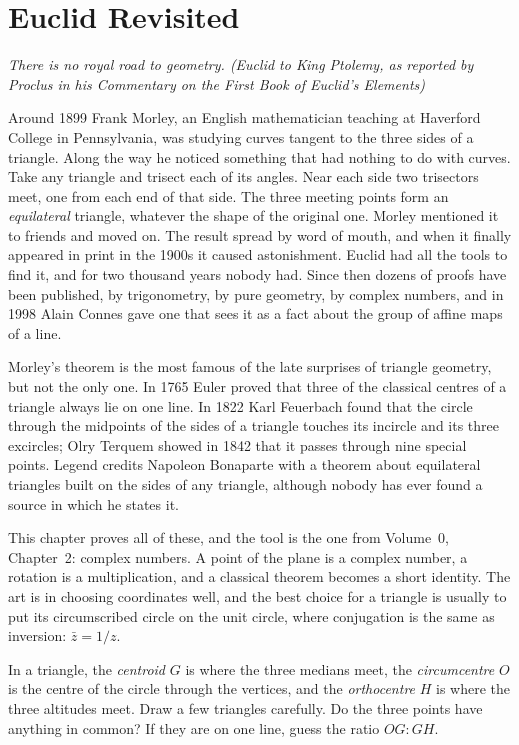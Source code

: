 \chapter{Euclid Revisited}\label{geometry:ch:euclid}

\begin{center}\itshape
There is no royal road to geometry.
\upshape(Euclid to King Ptolemy, as reported by Proclus in his \emph{Commentary on the First Book of Euclid's Elements})
\end{center}

Around 1899 Frank Morley, an English mathematician teaching at Haverford College in Pennsylvania, was studying curves
tangent to the three sides of a triangle. Along the way he noticed something that had nothing to do with curves. Take any
triangle and trisect each of its angles. Near each side two trisectors meet, one from each end of that side. The three
meeting points form an \emph{equilateral} triangle, whatever the shape of the original one. Morley mentioned it to friends
and moved on. The result spread by word of mouth, and when it finally appeared in print in the 1900s it caused
astonishment. Euclid had all the tools to find it, and for two thousand years nobody had. Since then dozens of proofs
have been published, by trigonometry, by pure geometry, by complex numbers, and in 1998 Alain Connes gave one that sees it
as a fact about the group of affine maps of a line.

Morley's theorem is the most famous of the late surprises of triangle geometry, but not the only one. In 1765 Euler proved that
three of the classical centres of a triangle always lie on one line. In 1822 Karl Feuerbach found that the circle through the midpoints of the sides
of a triangle touches its incircle and its three excircles; Olry Terquem showed in 1842 that it passes through nine special points. Legend credits Napoleon Bonaparte with a theorem about
equilateral triangles built on the sides of any triangle, although nobody has ever found a source in which he states it.

This chapter proves all of these, and the tool is the one from Volume~0, Chapter~2: complex numbers. A point of the plane is a
complex number, a rotation is a multiplication, and a classical theorem becomes a short identity. The art is in choosing
coordinates well, and the best choice for a triangle is usually to put its circumscribed circle on the unit circle, where
conjugation is the same as inversion: $\bar z=1/z$.

\begin{think}
In a triangle, the \emph{centroid} $G$ is where the three medians meet, the \emph{circumcentre} $O$ is the centre of the circle
through the vertices, and the \emph{orthocentre} $H$ is where the three altitudes meet. Draw a few triangles carefully. Do the
three points have anything in common? If they are on one line, guess the ratio $OG:GH$.
\end{think}

